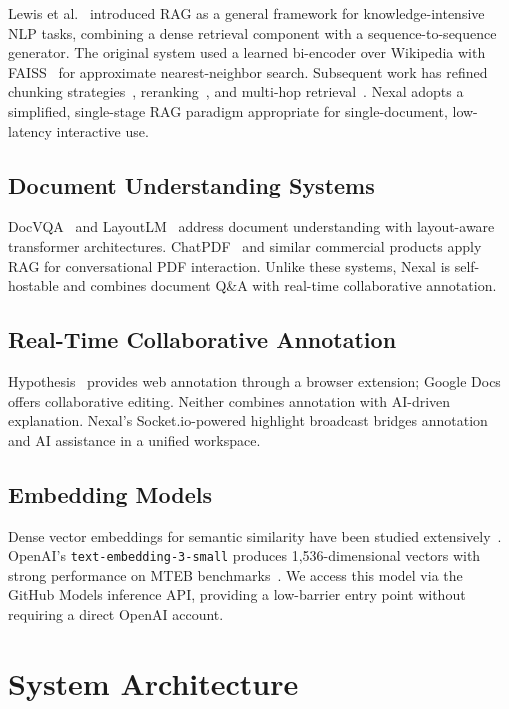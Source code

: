 \documentclass[conference]{IEEEtran}
\begin{document}
Lewis et al.~\cite{lewis2020rag} introduced RAG as a general framework for knowledge-intensive NLP tasks, combining a dense retrieval component with a sequence-to-sequence generator. The original system used a learned bi-encoder over Wikipedia with FAISS~\cite{johnson2019faiss} for approximate nearest-neighbor search. Subsequent work has refined chunking strategies~\cite{ram2023incontext}, reranking~\cite{nogueira2019passage}, and multi-hop retrieval~\cite{zhao2022multihop}. Nexal adopts a simplified, single-stage RAG paradigm appropriate for single-document, low-latency interactive use.

\subsection{Document Understanding Systems}

DocVQA~\cite{mathew2021docvqa} and LayoutLM~\cite{xu2020layoutlm} address document understanding with layout-aware transformer architectures. ChatPDF~\cite{chatpdf2023} and similar commercial products apply RAG for conversational PDF interaction. Unlike these systems, Nexal is self-hostable and combines document Q\&A with real-time collaborative annotation.

\subsection{Real-Time Collaborative Annotation}

Hypothesis~\cite{hypothesis} provides web annotation through a browser extension; Google Docs offers collaborative editing. Neither combines annotation with AI-driven explanation. Nexal's Socket.io-powered highlight broadcast bridges annotation and AI assistance in a unified workspace.

\subsection{Embedding Models}

Dense vector embeddings for semantic similarity have been studied extensively~\cite{reimers2019sbert,wang2022text}. OpenAI's \texttt{text-embedding-3-small} produces 1,536-dimensional vectors with strong performance on MTEB benchmarks~\cite{muennighoff2022mteb}. We access this model via the GitHub Models inference API, providing a low-barrier entry point without requiring a direct OpenAI account.

\section{System Architecture}
\label{sec:architecture}
\end{document}
